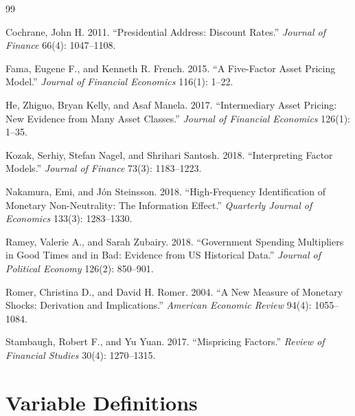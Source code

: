 \documentclass[12pt,letterpaper]{article}
\theoremstyle{plain}
\theoremstyle{definition}
\begin{document}
\begin{thebibliography}{99}

Cochrane, John H. 2011. ``Presidential Address: Discount Rates.'' \textit{Journal of Finance} 66(4): 1047--1108.

Fama, Eugene F., and Kenneth R. French. 2015. ``A Five-Factor Asset Pricing Model.'' \textit{Journal of Financial Economics} 116(1): 1--22.

He, Zhiguo, Bryan Kelly, and Asaf Manela. 2017. ``Intermediary Asset Pricing: New Evidence from Many Asset Classes.'' \textit{Journal of Financial Economics} 126(1): 1--35.

Kozak, Serhiy, Stefan Nagel, and Shrihari Santosh. 2018. ``Interpreting Factor Models.'' \textit{Journal of Finance} 73(3): 1183--1223.

Nakamura, Emi, and J\'on Steinsson. 2018. ``High-Frequency Identification of Monetary Non-Neutrality: The Information Effect.'' \textit{Quarterly Journal of Economics} 133(3): 1283--1330.

Ramey, Valerie A., and Sarah Zubairy. 2018. ``Government Spending Multipliers in Good Times and in Bad: Evidence from US Historical Data.'' \textit{Journal of Political Economy} 126(2): 850--901.

Romer, Christina D., and David H. Romer. 2004. ``A New Measure of Monetary Shocks: Derivation and Implications.'' \textit{American Economic Review} 94(4): 1055--1084.

Stambaugh, Robert F., and Yu Yuan. 2017. ``Mispricing Factors.'' \textit{Review of Financial Studies} 30(4): 1270--1315.

\end{thebibliography}


\newpage
\appendix
\doublespacing

\section{Variable Definitions}\label{app:variables}
\end{document}
